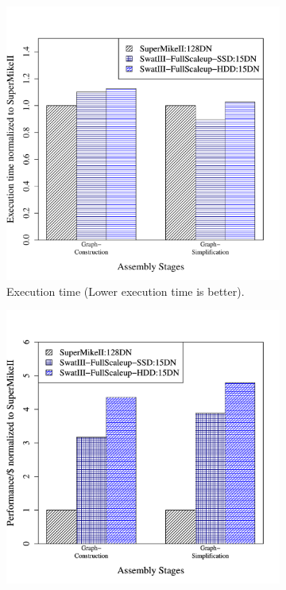 \documentclass[conference]{IEEEtran}
\begin{document}
\begin{figure}[htb]
        \begin{subfigure}[b]{0.23\textwidth}
                \includegraphics[width=\textwidth]{Figure/PerormanceData/Plots/PerfDiffArchHum.pdf}
                \caption{Execution time (Lower execution time is better).}
                \label{fig:DifferentArchitecturesPerfHum}
        \end{subfigure}
        \begin{subfigure}[b]{0.23\textwidth}
                \includegraphics[width=\textwidth]{Figure/PerormanceData/Plots/PerfPerDollarDiffArchHum.pdf}

\end{subfigure}
\end{figure}
\end{document}
